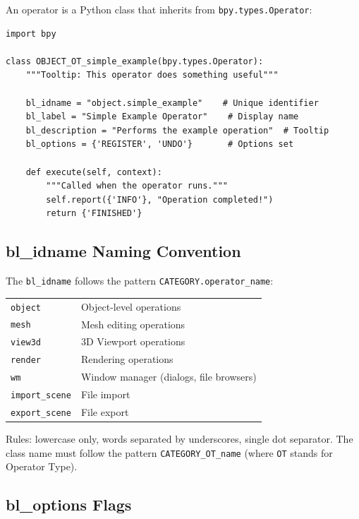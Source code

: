 An operator is a Python class that inherits from \texttt{bpy.types.Operator}:

\begin{lstlisting}
import bpy

class OBJECT_OT_simple_example(bpy.types.Operator):
    """Tooltip: This operator does something useful"""

    bl_idname = "object.simple_example"    # Unique identifier
    bl_label = "Simple Example Operator"    # Display name
    bl_description = "Performs the example operation"  # Tooltip
    bl_options = {'REGISTER', 'UNDO'}       # Options set

    def execute(self, context):
        """Called when the operator runs."""
        self.report({'INFO'}, "Operation completed!")
        return {'FINISHED'}
\end{lstlisting}

\subsection{bl\_idname Naming Convention}

The \texttt{bl\_idname} follows the pattern \texttt{CATEGORY.operator\_name}:

\begin{center}
\begin{tabularx}{\textwidth}{L{3cm}X}
\toprule
{}
 &  \\
\midrule
\texttt{object} & Object-level operations \\
\texttt{mesh} & Mesh editing operations \\
\texttt{view3d} & 3D Viewport operations \\
\texttt{render} & Rendering operations \\
\texttt{wm} & Window manager (dialogs, file browsers) \\
\texttt{import\_scene} & File import \\
\texttt{export\_scene} & File export \\
\bottomrule
\end{tabularx}
\end{center}

Rules: lowercase only, words separated by underscores, single dot separator. The class name must follow the pattern \texttt{CATEGORY\_OT\_name} (where \texttt{OT} stands for Operator Type).

\subsection{bl\_options Flags}

